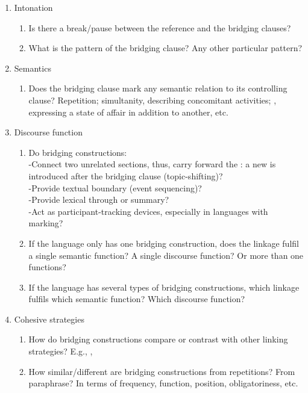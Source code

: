 \documentclass[output=paper]{LSP/langsci}
\begin{document}
\begin{enumerate}
\item  Intonation
\begin{enumerate}
\item  Is there a break/pause between the reference and the bridging clauses? 
\item  What is the  pattern of the bridging clause? Any other particular  pattern?
\end{enumerate}

\item   Semantics
\begin{enumerate}
\item Does the bridging clause mark any semantic relation to its controlling clause? Repetition; simultanity, describing concomitant activities; , expressing a state of affair in addition to another, etc.
\end{enumerate}

\item   Discourse function 
\begin{enumerate}
\item  Do bridging constructions: \\
-Connect two unrelated sections, thus, carry forward the : a new  is introduced after the bridging clause (topic-shifting)?\\
-Provide textual boundary (event sequencing)?\\
-Provide lexical  through  or summary?\\
-Act as participant-tracking devices, especially in languages with  marking? 
\item  If the language only has one bridging construction, does the linkage fulfil a single semantic function? A single discourse function? Or more than one functions?
\item  If the language has several types of bridging constructions, which linkage fulfils which semantic function? Which discourse function?
\end{enumerate}

\item   Cohesive strategies
\begin{enumerate}
\item How do bridging constructions compare or contrast with other linking strategies? 
E.g., ,  
\item  How similar/different are bridging constructions from repetitions? From paraphrase?
In terms of frequency, function, position, obligatoriness, etc.
\end{enumerate}


\end{enumerate}
\end{document}
